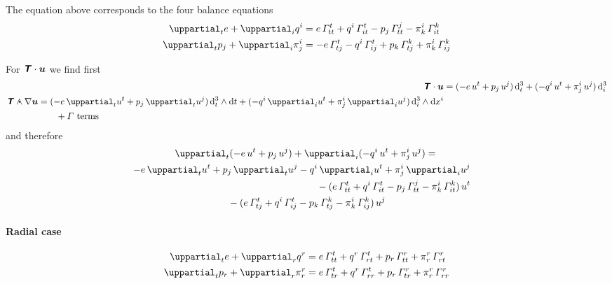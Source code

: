 \documentclass[\ifafour a4paper,12pt,\else a5paper,10pt,\fi%
onecolumn,oneside,article,%
british%
]{memoir}
\theoremstyle{remark}
\theoremstyle{innote}
\newcommand*{\mathte}[1]{\textbf{\textit{\textsf{#1}}}}
\newcommand*{\de}{\uppartial}%
\newcommand*{\di}{\mathrm{d}}%
\renewcommand*{\|}[1][]{\nonscript\:#1\vert\nonscript\:\mathopen{}}
\newcommand*{\dand}{\mathbin{\mathclap{\mkern12.5mu\bm{\cdot}}\wedge}}
\newcommand*{\ttti}[1]{\di^{3}_{#1}}
\newcommand*{\yT}{\mathte{T}}
\newcommand*{\yu}{\bm{u}}
\begin{document}
The equation above corresponds to the four balance equations
\begin{align}
  \label{eq:div_e}
  \de_{t}e + \de_{i}q^{i} &=
  e\,\varGamma^{t}_{tt}
  +q^{i}\, \varGamma^{t}_{it}
  -p_{j}\, \varGamma^{j}_{tt}
  -\pi^{i}_{k}\, \varGamma^{k}_{it}
  \\
  \label{eq:div_p}
  \de_{t}p_{j} +  \de_{i}\pi^{i}_{j} &=
  -e\,\varGamma^{t}_{tj}
  -q^{i}\,\varGamma^{t}_{ij}
  +p_{k}\,\varGamma^{k}_{tj}
  +\pi^{i}_{k}\,\varGamma^{k}_{ij}
\end{align}

\medskip

For $\yT\cdot\yu$ we find first
\begin{align}
    \yT\cdot\yu &=
    (-e\,u^{t} + p_{j}\,u^{j})\,\ttti{t} +
    (-q^{i}\,u^{t} + \pi^{i}_{j}\,u^{j})\,\ttti{i}
    \\
    \begin{split}
      \yT \dand \nabla\yu &=
      (-e\,\de_{t} u^{t} + p_{j}\,\de_{t}u^{j})\,\ttti{t}\land\di t
      +(-q^{i}\,\de_{i}u^{t} + \pi^{i}_{j}\,\de_{i}u^{j})\,\ttti{i}\land\di x^{i}
      \\
      &\qquad{}+\text{$\varGamma$ terms}
    \end{split}
  \end{align}
and therefore
\begin{multline}
  \label{eq:DT_contracted_u}
  \de_{t}(-e\,u^{t} + p_{j}\,u^{j})
  +\de_{i}(-q^{i}\,u^{t} + \pi^{i}_{j}\,u^{j})
  ={}\\
  \shoveright{
    -e\,\de_{t} u^{t} + p_{j}\,\de_{t}u^{j}
  -q^{i}\,\de_{i}u^{t} + \pi^{i}_{j}\,\de_{i}u^{j}
}
  \\
  \shoveright{
  {}-(e\,\varGamma^{t}_{tt}
  +q^{i}\, \varGamma^{t}_{it}
  -p_{j}\, \varGamma^{j}_{tt}
  -\pi^{i}_{k}\, \varGamma^{k}_{it})\,u^{t}
}
  \\
  {}-(e\,\varGamma^{t}_{tj}
  +q^{i}\,\varGamma^{t}_{ij}
  -p_{k}\,\varGamma^{k}_{tj}
  -\pi^{i}_{k}\,\varGamma^{k}_{ij})\,u^{j}
\end{multline}


\bigskip

\paragraph{Radial case}

\begin{align}
  \label{eq:div_e_r}
  \de_{t}e + \de_{r}q^{r} &=
  e\,\varGamma^{t}_{tt}
  +q^{r}\, \varGamma^{t}_{rt}
  +p_{r}\, \varGamma^{r}_{tt}
  +\pi^{r}_{r}\, \varGamma^{r}_{rt}
  \\
  \label{eq:div_p_r}
  \de_{t}p_{r} +  \de_{r}\pi^{r}_{r} &=
  e\,\varGamma^{t}_{tr}
  +q^{r}\,\varGamma^{t}_{rr}
  +p_{r}\,\varGamma^{r}_{tr}
  +\pi^{r}_{r}\,\varGamma^{r}_{rr}
\end{align}
\end{document}
